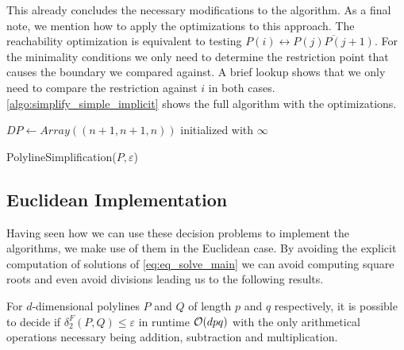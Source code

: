 This already concludes the necessary modifications to the algorithm. As a final note, we mention how to apply the optimizations to this approach. The reachability optimization is equivalent to testing \(P(i) \leftrightarrow \overline{P(j)P(j+1)}\). For the minimality conditions we only need to determine the restriction point that causes the boundary we compared against. A brief lookup shows that we only need to compare the restriction against \(i\) in both cases. \cref{algo:simplify_simple_implicit} shows the full algorithm with the optimizations.

\begin{algorithm}[ht]
  \DontPrintSemicolon
  \BlankLine
  \(DP \gets Array((n + 1, n + 1, n))\) initialized with \(\infty\) \;
  \caption{PolylineSimplification(\(P, \varepsilon\))}
  \label{algo:simplify_simple_implicit}
\end{algorithm}


\subsection{Euclidean Implementation}
Having seen how we can use these decision problems to implement the algorithms, we make use of them in the Euclidean case. By avoiding the explicit computation of solutions of \cref{eq:eq_solve_main} we can avoid computing square roots and even avoid divisions leading us to the following results. 

\begin{theorem}
  For \(d\)-dimensional polylines \(P\) and \(Q\) of length \(p\) and \(q\) respectively, it is possible to decide if \(\delta_2^F(P, Q) \leq \varepsilon\) in runtime \(\mathcal{O}(d p q)\) with the only arithmetical operations necessary being addition, subtraction and multiplication. 
\end{theorem}

